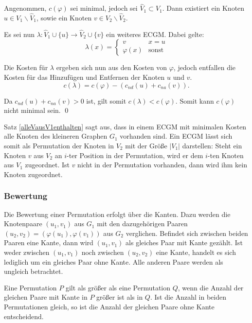 \begin{myProof}
Angenommen, $c(\varphi)$ sei minimal, jedoch sei $\hat{V}_1\subset V_1$. Dann
existiert ein Knoten $u \in V_1 \backslash \hat{V}_1$, sowie ein Knoten $v\in V_2
\backslash \hat{V}_2$.

Es sei nun $\lambda:\hat{V}_1 \cup \{u\} \rightarrow \hat{V}_2
\cup \{v\}$ ein weiteres ECGM. Dabei gelte:
\[
\lambda(x)=\left\{\begin{array}{ll}v & x = u \\
                                   \varphi(x) & \text{sonst}
                  \end{array}\right.
\]

Die Kosten für $\lambda$ ergeben sich nun aus den Kosten von $\varphi$, 
jedoch entfallen die Kosten für das Hinzufügen und Entfernen der Knoten 
$u$ und $v$.
\[ c(\lambda)=c(\varphi)-(c_{nd}(u)+c_{na}(v)). \]

Da $c_{nd}(u) + c_{na}(v)>0$ ist, gilt somit $c(\lambda)<c(\varphi)$. 
Somit kann $c(\varphi)$ nicht minimal sein. \qed
\end{myProof}

Satz \ref{alleVausV1enthalten} sagt aus, dass in einem ECGM 
mit minimalen Kosten 
alle Knoten des kleineren Graphen $G_1$ vorhanden sind. Ein 
ECGM lässt sich somit als Permutation der Knoten in $V_2$ 
mit der Größe $|V_1|$ darstellen: Steht ein Knoten $v$ aus $V_2$ 
an $i$-ter Position in der Permutation, wird er dem $i$-ten Knoten 
aus $V_1$ zugeordnet. Ist $v$ nicht in der Permutation vorhanden, 
dann wird ihm kein Knoten zugeordnet.

\subsubsection{Bewertung}
Die Bewertung einer Permutation erfolgt über die Kanten. Dazu werden 
die Knotenpaare $(u_1,v_1)$ aus $G_1$ mit den dazugehörigen Paaren 
$(u_2,v_2)=(\varphi(u_1),\varphi(v_1))$ aus $G_2$ verglichen. Befindet sich 
zwischen beiden Paaren eine Kante, dann wird $(u_1,v_1)$ als gleiches 
Paar mit Kante gezählt. Ist weder zwischen $(u_1,v_1)$ noch zwischen 
$(u_2,v_2)$ eine Kante, handelt es sich lediglich um ein gleiches Paar 
ohne Kante. Alle anderen Paare werden als ungleich betrachtet. 

Eine Permutation $P$ gilt als größer als eine Permutation $Q$, wenn die 
Anzahl der gleichen Paare mit Kante in $P$ größer ist als in $Q$. 
Ist die Anzahl in beiden Permutationen gleich, so ist die Anzahl der 
gleichen Paare ohne Kante entscheidend.

